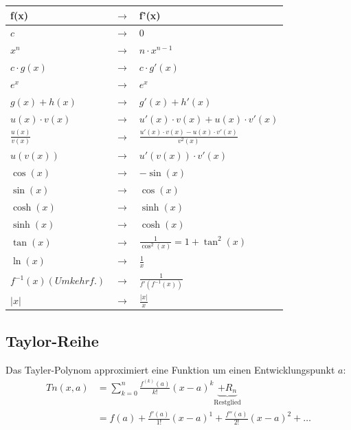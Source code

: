 {\setlength{\extrarowheight}{4pt}
\begin{tabular}{@{}lcl@{}}
	\textbf{f(x)} & $\rightarrow$ & \textbf{f'(x)} \\
	\toprule
	$c$ & $\rightarrow$ & $0$ \\
	$x^n$  & $\rightarrow$ & $n\cdot x^{n-1}$ \\
	$c\cdot g\left(x\right)$  & $\rightarrow$ & $c\cdot g'\left(x\right)$ \\
	$e^x$  & $\rightarrow$ & $e^x$ \\
	\midrule
	$g\left(x\right)+h\left(x\right)$  & $\rightarrow$ & $g'\left(x\right)+h'\left(x\right)$ \\
	$u\left(x\right)\cdot v\left(x\right)$  & $\rightarrow$ & $u'\left(x\right)\cdot v\left(x\right)+u\left(x\right)\cdot v'\left(x\right)$ \\ 
	$\frac{u\left(x\right)}{v\left(x\right)}$  & $\rightarrow$ & $\frac{u'\left(x\right)\cdot v\left(x\right)-u\left(x\right)\cdot v'\left(x\right)}{v^2\left(x\right)}$ \\
	$u\left(v\left(x\right)\right)$  & $\rightarrow$ & $u'\left(v\left(x\right)\right)\cdot v'\left(x\right)$ \\
	\midrule
	$\cos\left(x\right)$ & $\rightarrow$ & $-\sin(x)$ \\
	$\sin\left(x\right)$ & $\rightarrow$ & $\cos(x)$ \\	
	$\cosh\left(x\right)$ & $\rightarrow$ & $\sinh(x)$ \\
	$\sinh\left(x\right)$ & $\rightarrow$ & $\cosh(x)$ \\
	$\tan\left(x\right)$ & $\rightarrow$ & $\frac{1}{\cos^2(x)} = 1 + \tan^2(x)$ \\	
	$\ln\left(x\right)$ & $\rightarrow$ & $\frac{1}{x}$ \\
	$f^{-1}\left(x\right) {\scriptscriptstyle (Umkehrf.)}$  & $\rightarrow$ & $\frac{1}{f'(f^{-1}(x))}$ \\
	$\left|x\right|$ & $\rightarrow$ & $\frac{\left|x\right|}{x}$ \\
\end{tabular}
}


\subsection{Taylor-Reihe }
Das Tayler-Polynom approximiert eine Funktion um einen Entwicklungspunkt $a$:
\begin{align*}
	Tn(x, a) &= \sum\limits_{k = 0}^{n}\frac{f^{(k)}(a)}{k!}(x - a)^k \underbrace{+ R_n}_{\text{Restglied}}\\
	         &= f(a) + \frac{f'(a)}{1!}(x - a)^1 + \frac{f''(a)}{2!}(x - a)^2 + \dots
\end{align*}

